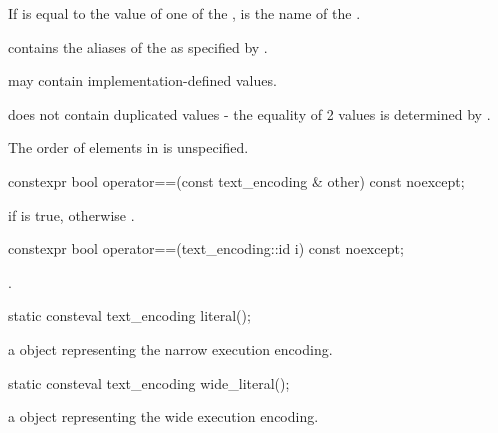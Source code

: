\documentclass{wg21}
\begin{document}
\begin{addedblock}
\begin{itemdescr}
\pnum If  is equal to the  value of one of the ,  is the name of the .

 contains the aliases of the  as specified by \cite{rfc2978}.

\pnum {} may contain implementation-defined values.

\pnum {} does not contain duplicated values - the equality of 2 values is determined by .

\begin{note}
The order of elements in  is unspecified.
\end{note}

\end{itemdescr}

\begin{itemdecl}
constexpr bool operator==(const text_encoding & other) const noexcept;
\end{itemdecl}

\begin{itemdescr}
\returns
{} if  is true,
otherwise
.
\end{itemdescr}

\begin{itemdecl}
constexpr bool operator==(text_encoding::id i) const noexcept;
\end{itemdecl}

\begin{itemdescr}
\returns {}.
\end{itemdescr}

\begin{itemdecl}
static consteval text_encoding literal();
\end{itemdecl}

\begin{itemdescr}
    \returns a  object representing the narrow execution encoding.
\end{itemdescr}

\begin{itemdecl}
static consteval text_encoding wide_literal();
\end{itemdecl}

\begin{itemdescr}
    \returns a  object representing the wide execution encoding.
\end{itemdescr}


\end{addedblock}
\end{document}
